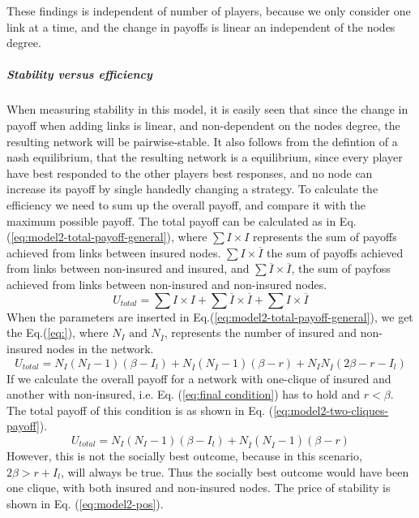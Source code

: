 These findings is independent of number of players, because we only consider one link at a time, and the change in payoffs is linear an independent of the nodes degree.
\subparagraph{Stability versus efficiency}
When measuring stability in this model, it is easily seen that since the change in payoff when adding links is linear, and non-dependent on the nodes degree, the resulting network will be pairwise-stable. It also follows from the defintion of a nash equilibrium, that the resulting network is a equilibrium, since every player have best responded to the other players best responses, and no node can increase its payoff by single handedly changing a strategy. 
To calculate the efficiency we need to sum up the overall payoff, and compare it with the maximum possible payoff.  The total payoff can be calculated as in Eq.(\ref{eq:model2-total-payoff-general}), where $\sum I \times I$ represents the sum of payoffs achieved from links between insured nodes. $\sum I \times \overline{I}$ the sum of payoffs achieved from links between non-insured and insured, and $\sum \overline{I} \times \overline{I}$, the sum of payfoss achieved from links between non-insured and non-insured nodes. 
\begin{equation}
U_{total}=\sum I \times I+\sum \overline{I}\times\overline{I}+\sum I\times\overline{I}
\label{eq:model2-total-payoff-general}
\end{equation}
When the parameters are inserted in Eq.(\ref{eq:model2-total-payoff-general}), we get the Eq.(\ref{eq:}), where $N_{I} \text{ and } N_{\overline{I}}$, represents the number of insured and non-insured nodes in the network.
\begin{equation}
U_{total}=N_{I}(N_{I}-1)(\beta-I_{l})+N_{\overline{I}}(N_{\overline{I}}-1)(\beta-r)+N_{I}N_{\overline{I}}(2\beta-r-I_{l})
\label{eq:model2-total-payoff}
\end{equation}
If we calculate the overall payoff for a network with one-clique of insured and another with non-insured, i.e. Eq. (\ref{eq:final condition}) has to hold and $r<\beta$. The total payoff of this condition is as shown in Eq. (\ref{eq:model2-two-cliques-payoff}).
\begin{equation}
U_{total}=N_{I}(N_{I}-1)(\beta-I_{l})+N_{\overline{I}}(N_{\overline{I}}-1)(\beta-r)
\label{eq:model2-two-cliques-payoff}
\end{equation}
However, this is not the socially best outcome, because in this scenario, $2\beta>r+I_{l}$, will always be true. Thus the socially best outcome would have been one clique, with both insured and non-insured nodes. The price of stability is shown in Eq. (\ref{eq:model2-pos}).
